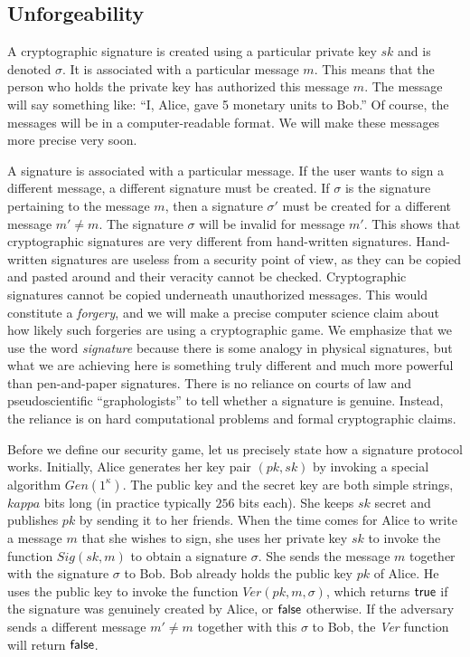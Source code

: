 \subsection*{Unforgeability}

A cryptographic signature is created using a particular private key $sk$ and is
denoted $\sigma$. It is associated with a particular message $m$. This means that
the person who holds the private key has authorized this message $m$. The message
will say something like: ``I, Alice, gave 5 monetary units to Bob.'' Of course, the
messages will be in a computer-readable format. We will make these messages more
precise very soon.

A signature is associated with a particular message. If the user wants to sign a
different message, a different signature must be created. If $\sigma$ is the signature
pertaining to the message $m$, then a signature $\sigma'$ must be created for a
different message $m' \neq m$. The signature $\sigma$ will be invalid for message $m'$.
This shows that cryptographic signatures are very different from hand-written signatures.
Hand-written signatures are useless from a security point of view, as they can be
copied and pasted around and their veracity cannot be checked. Cryptographic
signatures cannot be copied underneath unauthorized messages. This would constitute
a \emph{forgery}, and we will make a precise computer science claim about how
likely such forgeries are using a cryptographic game. We emphasize that we use the
word \emph{signature} because there is some analogy in physical signatures, but
what we are achieving here is something truly different and much more powerful
than pen-and-paper signatures. There is no reliance on courts of law and pseudoscientific
``graphologists'' to tell whether a signature is genuine. Instead, the reliance is
on hard computational problems and formal cryptographic claims.

Before we define our security game, let us precisely state how a signature protocol
works. Initially, Alice generates her key pair $(pk, sk)$ by invoking a special algorithm
$Gen(1^\kappa)$. The public key and the secret key are both simple strings, $kappa$
bits long (in practice typically $256$ bits each).
She keeps $sk$ secret and publishes $pk$ by
sending it to her friends. When the time comes for Alice to write a message $m$
that she wishes to sign, she uses her private key $sk$ to invoke the function
$Sig(sk, m)$ to obtain a signature $\sigma$. She sends the message $m$ together
with the signature $\sigma$ to Bob. Bob already holds the public key $pk$ of Alice.
He uses the public key to invoke the function $Ver(pk, m, \sigma)$, which returns
$\textsf{true}$ if the signature was genuinely created by Alice, or $\textsf{false}$ otherwise.
If the adversary sends a different message $m' \neq m$ together with this $\sigma$
to Bob, the \emph{Ver} function will return $\textsf{false}$.

